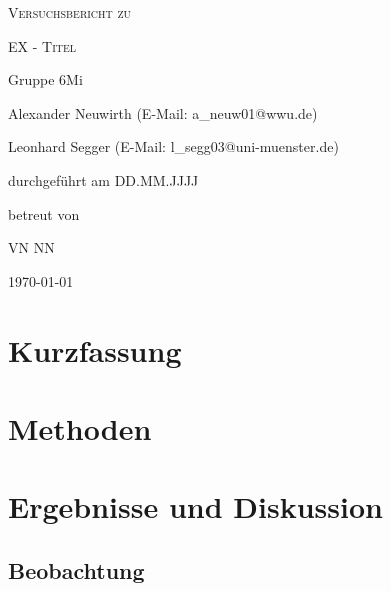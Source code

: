 \documentclass[
	a4paper,
	12pt,
	pagesize,
	ngerman
]{scrartcl}
\begin{document}
	
	\begin{titlepage}
		\centering
		{\scshape\LARGE Versuchsbericht zu \par}
		\vspace{1cm}
		{\scshape\huge EX - Titel \par} %
		\vspace{2.5cm}
		{\LARGE Gruppe 6Mi \par}
		\vspace{0.5cm}
		
		{\large Alexander Neuwirth (E-Mail: a\_neuw01@wwu.de) \par}
		{\large Leonhard Segger (E-Mail: l\_segg03@uni-muenster.de) \par}
		\vfill
		
		durchgeführt am DD.MM.JJJJ\par %
		betreut von\par
		{\large VN NN} %
		
		\vfill
		
		{\large \today\par}
	\end{titlepage}
	\tableofcontents
	\newpage


	\section{Kurzfassung}
	
	\section{Methoden}
	
	\section{Ergebnisse und Diskussion}
	

	\subsection{Beobachtung}
\end{document}
